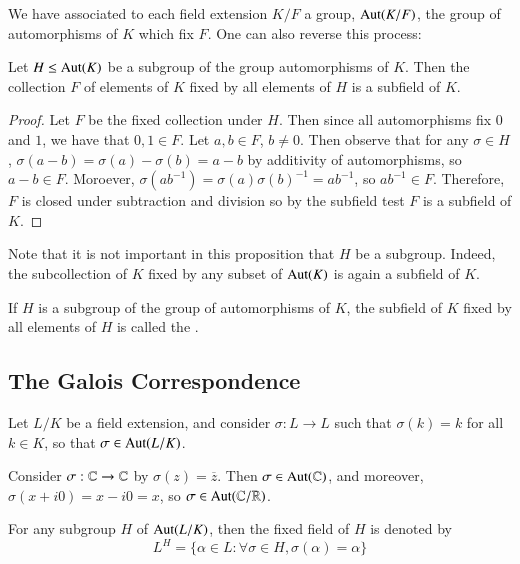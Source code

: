 We have associated to each field extension $K/F$ a group, $\operatorname{Aut}(K/F)$, the group of automorphisms of $K$ which fix $F$. One can also reverse this process: 

\begin{prop}
    Let $H \leq \operatorname{Aut}(K)$ be a subgroup of the group automorphisms of $K$. Then the collection $F$ of elements of $K$ fixed by all elements of $H$ is a subfield of $K$.
\end{prop}
\begin{proof}
    Let $F$ be the fixed collection under $H$. Then since all automorphisms fix $0$ and $1$, we have that $0,1 \in F$. Let $a,b \in F$, $b \neq 0$. Then observe that for any $\sigma \in H$, $\sigma(a-b) = \sigma(a)-\sigma(b) = a-b$ by additivity of automorphisms, so $a-b \in F$. Moroever, $\sigma(ab^{-1}) = \sigma(a)\sigma(b)^{-1} = ab^{-1}$, so $ab^{-1} \in F$. Therefore, $F$ is closed under subtraction and division so by the subfield test $F$ is a subfield of $K$.
\end{proof}

Note that it is not important in this proposition that $H$ be a subgroup. Indeed, the subcollection of $K$ fixed by any subset of $\operatorname{Aut}(K)$ is again a subfield of $K$.

\begin{defn}
    If $H$ is a subgroup of the group of automorphisms of $K$, the subfield of $K$ fixed by all elements of $H$ is called the .
\end{defn}

\subsection{The Galois Correspondence}

Let $L/K$ be a field extension, and consider $\sigma:L\rightarrow L$ such that $\sigma(k) = k$ for all $k \in K$, so that $\sigma \in \operatorname{Aut}(L/K)$. 

\begin{eg}
    Consider $\sigma:\mathbb C\rightarrow \mathbb C$ by $\sigma(z) = \overline{z}$. Then $\sigma \in \operatorname{Aut}(\mathbb C)$, and moreover, $\sigma(x+i0) = x-i0 = x$, so $\sigma \in \operatorname{Aut}(\mathbb C/\mathbb R)$. 
\end{eg}

\begin{defn}
    For any subgroup $H$ of $\operatorname{Aut}(L/K)$, then the fixed field of $H$ is denoted by $$L^H = \{\alpha \in L:\forall \sigma \in H,\sigma(\alpha) = \alpha\}$$
\end{defn}

